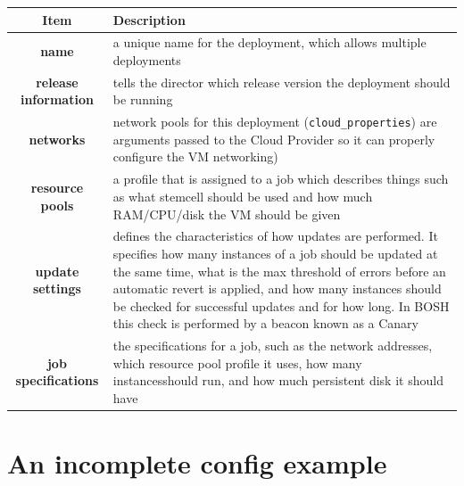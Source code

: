 \begin{table}[htbp]
\begin{minipage}{\linewidth}
\setlength{\tymax}{0.5\linewidth}
\centering
\small
\begin{tabulary}{\textwidth}{@{}CL@{}} \toprule
Item&Description\\
\midrule
\textbf{name}&a unique name for the deployment, which allows multiple deployments\\
\textbf{release information}&tells the director which release version the deployment should be running\\
\textbf{networks}&network pools for this deployment (\texttt{cloud\_properties}) are arguments passed to the Cloud Provider so it can properly configure the VM networking)\\
\textbf{resource pools}&a profile that is assigned to a job which describes things such as what stemcell should be used and how much RAM\slash CPU\slash disk the VM should be given\\
\textbf{update settings}&defines the characteristics of how updates are performed. It specifies how many instances of a job should be updated at the same time, what is the max threshold of errors before an automatic revert is applied, and how many instances should be checked for successful updates and for how long. In BOSH this check is performed by a beacon known as a Canary\\
\textbf{job specifications}&the specifications for a job, such as the network addresses, which resource pool profile it uses, how many instancesshould run, and how much persistent disk it should have\\

\bottomrule

\end{tabulary}
\end{minipage}
\end{table}


\section{An incomplete config example}
\label{anincompleteconfigexample}

